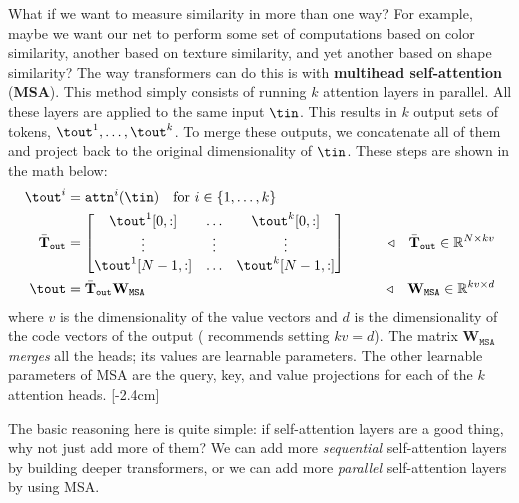 What if we want to measure similarity in more than one way? For example, maybe we want our net to perform some set of computations based on color similarity, another based on texture similarity, and yet another based on shape similarity? The way transformers can do this is with \textbf{multihead self-attention} (\textbf{MSA}). This method simply consists of running $k$ attention layers in parallel. All these layers are applied to the same input $\tin$. This results in $k$ output sets of tokens, $\tout^1, \ldots, \tout^k$. To merge these outputs, we concatenate all of them and project back to the original dimensionality of $\tin$. These steps are shown in the math below:
\begin{align}
    \tout^i &= \texttt{attn}^i(\tin) \quad \text{for } i \in \{1,\ldots,k\}\\
    \bar{\mathbf{T}}_{\texttt{out}} &= \begin{bmatrix}
        \tout^1[0,:] & \ldots & \tout^k[0,:]\\
        \vdots & \vdots & \vdots \\
        \tout^1[N-1,:] & \ldots & \tout^k[N-1,:]\\
    \end{bmatrix} &\quad\quad \triangleleft \quad \bar{\mathbf{T}}_{\texttt{out}} \in \mathbb{R}^{N \times kv}\\
    \tout &= \bar{\mathbf{T}}_{\texttt{out}}\mathbf{W}_{\texttt{MSA}} &\quad\quad \triangleleft \quad \mathbf{W}_{\texttt{MSA}} \in \mathbb{R}^{kv \times d} \label{eqn:transformers:MSA_merge}
\end{align}
where $v$ is the dimensionality of the value vectors and $d$ is the dimensionality of the code vectors of the output (\cite{dosovitskiy2020vit} recommends setting $kv = d$). The matrix $\mathbf{W}_{\texttt{MSA}}$ \textit{merges} all the heads; its values are learnable parameters. The other learnable parameters of MSA are the query, key, and value projections for each of the $k$ attention heads.
[-2.4cm]

The basic reasoning here is quite simple: if self-attention layers are a good thing, why not just add more of them? We can add more \textit{sequential} self-attention layers by building deeper transformers, or we can add more \textit{parallel} self-attention layers by using MSA.

